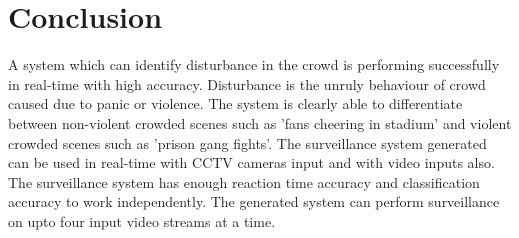 \chapter{Conclusion}

A system which can identify disturbance in the crowd is performing successfully in real-time with high accuracy. Disturbance is the unruly behaviour of crowd caused due to panic or violence. The system is clearly able to differentiate between non-violent crowded scenes such as 'fans cheering in stadium' and violent crowded scenes such as 'prison gang fights'. The surveillance system generated can be used in real-time with CCTV cameras input and with video inputs also. The surveillance system has enough reaction time accuracy and classification accuracy to work independently. The generated system can perform surveillance on upto four input video streams at a time.